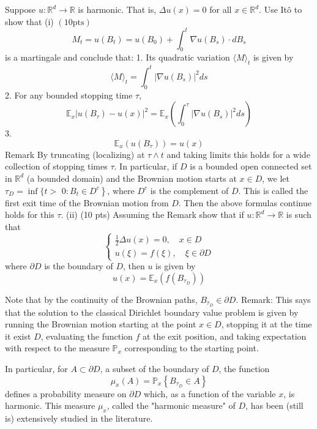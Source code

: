\begin{problem}
	Suppose $u: \mathbb{R}^d \rightarrow \mathbb{R}$ is harmonic. That is, $\Delta u(x)=0$ for all $x \in \mathbb{R}^d$. Use Itô to show that
(i) $(10 \mathrm{pts})$
\[
M_t=u\left(B_t\right)=u\left(B_0\right)+\int_0^t \nabla u\left(B_s\right) \cdot d B_s
\]
is a martingale and conclude that:
1. Its quadratic variation $\langle M\rangle_t$ is given by
\[
\langle M\rangle_t=\int_0^t\left|\nabla u\left(B_s\right)\right|^2 d s
\]
2. For any bounded stopping time $\tau$,
\[
\mathbb{E}_x\left|u\left(B_\tau\right)-u(x)\right|^2=\mathbb{E}_x\left(\int_0^\tau\left|\nabla u\left(B_s\right)\right|^2 d s\right)
\]
3.
\[
\mathbb{E}_x\left(u\left(B_\tau\right)\right)=u(x)
\]
Remark By truncating (localizing) at $\tau \wedge t$ and taking limits this holds for a wide collection of stopping times $\tau$. In particular, if $D$ is a bounded open connected set in $\mathbb{R}^d$ (a bounded domain) and the Brownian motion starts at $x \in D$, we let $\tau_D=\inf \{t>$ $\left.0: B_t \in D^c\right\}$, where $D^c$ is the complement of $D$. This is called the first exit time of the Brownian motion from $D$. Then the above formulas continue holds for this $\tau$.
(ii) (10 pts) Assuming the Remark show that if $u: \mathbb{R}^d \rightarrow \mathbb{R}$ is such that
\[
\left\{\begin{array}{l}
\frac{1}{2} \Delta u(x)=0, \quad x \in D \\
u(\xi)=f(\xi), \quad \xi \in \partial D
\end{array}\right.
\]
where $\partial D$ is the boundary of $D$, then $u$ is given by
\[
u(x)=\mathbb{E}_x\left(f\left(B_{\tau_D}\right)\right)
\]

Note that by the continuity of the Brownian paths, $B_{\tau_D} \in \partial D$.
Remark: This says that the solution to the classical Dirichlet boundary value problem is given by running the Brownian motion starting at the point $x \in D$, stopping it at the time it exist $D$, evaluating the function $f$ at the exit position, and taking expectation with respect to the measure $\mathbb{P}_x$ corresponding to the starting point.

In particular, for $A \subset \partial D$, a subset of the boundary of $D$, the function
\[
\mu_x(A)=\mathbb{P}_x\left\{B_{\tau_D} \in A\right\}
\]
defines a probability measure on $\partial D$ which, as a function of the variable $x$, is harmonic. This measure $\mu_x$, called the "harmonic measure" of $D$, has been (still is) extensively studied in the literature.
\end{problem}
